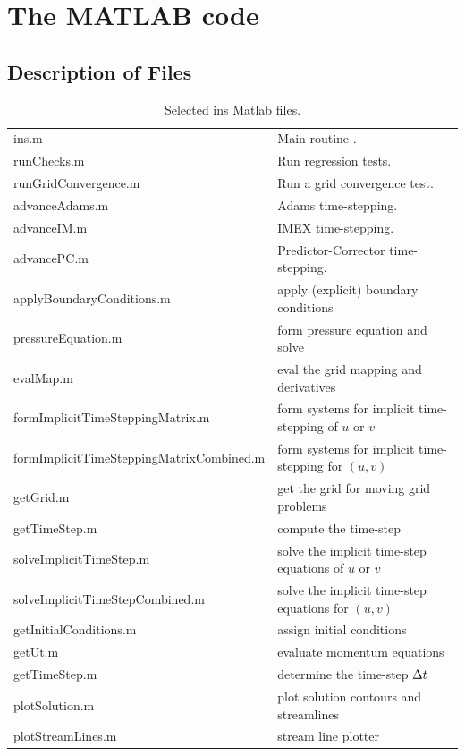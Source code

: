 
\newpage
\section{The MATLAB code}

\subsection{Description of Files}

\begin{table}[H]\small %
\begin{center}
\begin{tabular}{ll} %
  ins.m                             &  Main routine . \\
  runChecks.m                       &  Run regression tests. \\
  runGridConvergence.m              &  Run a grid convergence test. \\
  advanceAdams.m                    &  Adams time-stepping. \\
  advanceIM.m                       &  IMEX time-stepping. \\
  advancePC.m                       &  Predictor-Corrector time-stepping. \\
  applyBoundaryConditions.m         & apply (explicit) boundary conditions  \\
  pressureEquation.m                & form pressure equation and solve \\
  evalMap.m                         & eval the grid mapping and derivatives \\
  formImplicitTimeSteppingMatrix.m  & form systems for implicit time-stepping of $u$ or $v$ \\
  formImplicitTimeSteppingMatrixCombined.m  & form systems for implicit time-stepping for $(u,v)$ \\
  getGrid.m                         & get the grid for moving grid problems \\
  getTimeStep.m                     & compute the time-step \\
  solveImplicitTimeStep.m           & solve the implicit time-step equations of $u$ or $v$ \\
  solveImplicitTimeStepCombined.m   & solve the implicit time-step equations for $(u,v)$ \\
  getInitialConditions.m            & assign initial conditions \\
  getUt.m                           & evaluate momentum equations \\
  getTimeStep.m                     & determine the time-step $\Delta t$ \\
  plotSolution.m                    & plot solution contours and streamlines \\
  plotStreamLines.m                 & stream line plotter 
\end{tabular}
  \caption{Selected ins Matlab files.}
\end{center}
\end{table}

